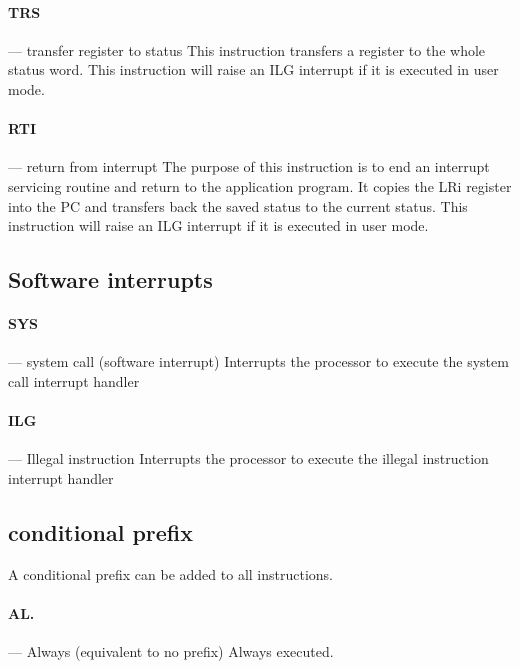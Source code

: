 \documentclass[11pt]{article}
\begin{document}
\paragraph{TRS} --- transfer register to status\newline
This instruction transfers a register to the whole status word. \newline
This instruction will raise an ILG interrupt if it is executed in user mode.

\paragraph{RTI} --- return from interrupt\newline
The purpose of this instruction is to end an interrupt servicing routine and 
return to the application program. It copies the LRi register into the PC and
transfers back the saved status to the current status. \newline
This instruction will raise an ILG interrupt if it is executed in user mode.

\subsection{Software interrupts}

\paragraph{SYS} --- system call (software interrupt)\newline
Interrupts the processor to execute the system call interrupt handler

\paragraph{ILG} --- Illegal instruction\newline
Interrupts the processor to execute the illegal instruction interrupt handler

\subsection{conditional prefix}
A conditional prefix can be added to all instructions.

\paragraph{AL.} --- Always (equivalent to no prefix) \newline
Always executed.
\end{document}
